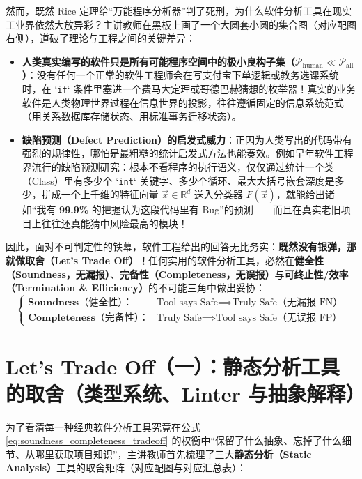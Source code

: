 \documentclass[a4paper]{article}
\begin{document}
然而，既然 Rice 定理给“万能程序分析器”判了死刑，为什么软件分析工具在现实工业界依然大放异彩？主讲教师在黑板上画了一个大圆套小圆的集合图（对应配图右侧），道破了理论与工程之间的关键差异：
\begin{itemize}
    \item \textbf{人类真实编写的软件只是所有可能程序空间中的极小良构子集（$\mathcal{P}_{\text{human}} \ll \mathcal{P}_{\text{all}}$）}：没有任何一个正常的软件工程师会在写支付宝下单逻辑或教务选课系统时，在 `\texttt{if}` 条件里塞进一个费马大定理或哥德巴赫猜想的枚举器！真实的业务软件是人类物理世界过程在信息世界的投影，往往遵循固定的信息系统范式（用关系数据库存储状态、用标准事务迁移状态）。
    \item \textbf{缺陷预测（Defect Prediction）的启发式威力}：正因为人类写出的代码带有强烈的规律性，哪怕是最粗糙的统计启发式方法也能奏效。例如早年软件工程界流行的缺陷预测研究：根本不看程序的执行语义，仅仅通过统计一个类（Class）里有多少个 `\texttt{int}` 关键字、多少个循环、最大大括号嵌套深度是多少，拼成一个上千维的特征向量 $\vec{x} \in \mathbb{R}^d$ 送入分类器 $F(\vec{x})$，就能给出诸如“我有 \textbf{99.9\%} 的把握认为这段代码里有 Bug”的预测——而且在真实老旧项目上往往还真能猜中风险最高的模块！
\end{itemize}

因此，面对不可判定性的铁幕，软件工程给出的回答无比务实：\textbf{既然没有银弹，那就做取舍（Let's Trade Off）！}任何实用的软件分析工具，必然在\textbf{健全性（Soundness，无漏报）}、\textbf{完备性（Completeness，无误报）}与\textbf{可终止性/效率（Termination \& Efficiency）}的不可能三角中做出妥协：
\begin{equation}
\begin{cases}
\textbf{Soundness（健全性）：} & \text{Tool says Safe} \implies \text{Truly Safe（无漏报 FN）} \\[4pt]
\textbf{Completeness（完备性）：} & \text{Truly Safe} \implies \text{Tool says Safe（无误报 FP）}
\end{cases}
\label{eq:soundness_completeness_tradeoff}
\end{equation}

\section{Let's Trade Off（一）：静态分析工具的取舍（类型系统、Linter 与抽象解释）}

为了看清每一种经典软件分析工具究竟在公式 \eqref{eq:soundness_completeness_tradeoff} 的权衡中“保留了什么抽象、忘掉了什么细节、从哪里获取项目知识”，主讲教师首先梳理了三大\textbf{静态分析（Static Analysis）}工具的取舍矩阵（对应配图与对应汇总表）：
\end{document}
